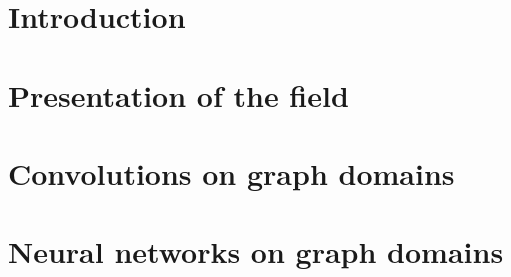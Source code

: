 \documentclass[12pt]{book}
\begin{document}

%
%


\newline



 \dominitoc
 \tableofcontents
 \adjustmtc

%
%

\chapter*{Introduction}\label{chp:int}
\todo{}

%
%

  \chapter{Presentation of the field}\label{chap:1}
  \minitoc
  \newpage

  \newpage
  \newpage
  \newpage

%
%

\setcounter{chapter}{1}
\chapter{Convolutions on graph domains}\label{chap:2}
  \minitoc
  \newpage

\newpage
\newpage
\newpage
\newpage
\newpage

%
%
 \setcounter{chapter}{2}
 \chapter{Neural networks on graph domains}\label{chap:3}
  \minitoc
  \newpage
\end{document}
